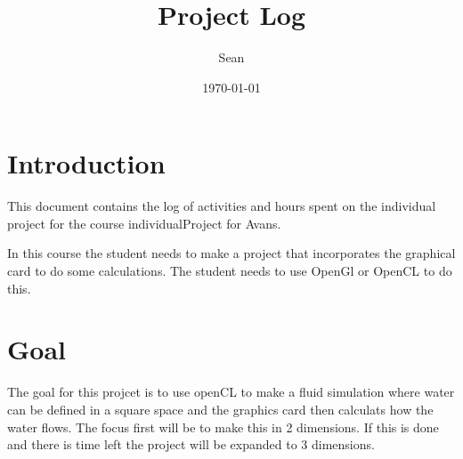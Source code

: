 \documentclass{article}
\title{Project Log}
\author{Sean}
\date{\today}
\begin{document}
\maketitle

\section*{Introduction}
This document contains the log of activities and hours spent on the individual project for the course individualProject for Avans.

In this course the student needs to make a project that incorporates the graphical card to do some calculations. The student needs to use OpenGl or OpenCL to do this.

\section*{Goal}
The goal for this projcet is to use openCL to make a fluid simulation where water can be defined in a square space and the graphics card then calculats how the water flows.
The focus first will be to make this in 2 dimensions. If this is done and there is time left the project will be expanded to 3 dimensions.
\end{document}
